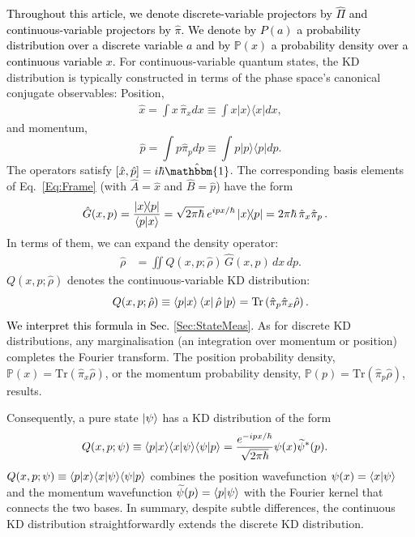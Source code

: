 \documentclass[%
 reprint,
superscriptaddress,
nofootinbib,
bibnotes,
 amsmath,amssymb,
 aps,
]{revtex4-1}
\theoremstyle{plain}
\newcommand*{\ketbra}[2]{\lvert #1 \rangle\!\langle #2 \rvert}
\newcommand{\Dave}[1]{\textcolor{black}{#1} }
\newcommand{\Stephan}[1]{\textcolor{black}{#1} }
\newcommand{\nicole}[1]{\textcolor{black}{#1} }
\begin{document}
\nicole{Throughout this article, we denote discrete-variable projectors by $\hat{\Pi}$ and continuous-variable projectors by $\hat{\pi}$.
We denote by $P(a)$ a probability distribution over a discrete variable $a$ and by $\mathbb{P}(x)$ a probability density over a continuous variable $x$.
}
For continuous-variable quantum states, the KD distribution is typically constructed in terms of the phase space's canonical conjugate observables: Position, 
\begin{eqnarray}
    \label{eq_position}
    \hat{x}=\int x \, \hat{\pi}_{x}dx 
    \equiv \int x \ketbra{x}{x}dx ,
\end{eqnarray}
and momentum,
\begin{equation}
    \label{eq_momentum}
    \hat{p}=\int p\hat{\pi}_{p}dp 
    \equiv \int p\ketbra{p}{p}dp  . 
\end{equation}
The operators satisfy $[\hat{x},\hat{p}]=i\hbar\hat{\mathbbm{1}}$. The corresponding 
\Dave{basis} elements of Eq.~\eqref{Eq:Frame} (with $\hat{A} = \hat{x}$ and $\hat{B} = \hat{p}$) have the form 
\begin{align}\label{eq:hatlambdaxp}
\hat{G}(x,p) & =\frac{\ketbra{x}{p}}{\braket{p|x}}
=\sqrt{2\pi\hbar} \: e^{ipx/\hbar} \, \ketbra{x}{p} 
=\Stephan{2\pi\hbar  \,  \hat\pi_x\hat \pi_p} \, .
\end{align}
In terms of them, we can expand the density operator:
\begin{align}
\hat{\rho} & =
\iint Q(x,p;\hat{\rho}) \, \hat{G}(x,p) \, dx \, dp.
\end{align}
$Q(x,p;\hat{\rho})$ denotes the continuous-variable KD distribution:
\begin{equation}
Q(x,p;\hat{\rho})
\equiv\braket{p|x}\bra{x}\hat{\rho}\ket{p}
=\mathrm{Tr}\left(  \hat{\pi}_{p}\hat{\pi}_{x}\hat{\rho}\right) .\label{eq:KD_continuous}
\end{equation}
\Dave{We interpret this formula in Sec. \ref{Sec:StateMeas}. } As 
for discrete KD distributions, any marginalisation (an integration over momentum or position) completes the Fourier transform. The position probability density, 
$\mathbb{P}(x)=\mathrm{Tr} \left( \hat{\pi}_{x}\hat{\rho} \right)$,
or the momentum probability density, 
$\mathbb{P}(p)  =  \mathrm{Tr}  \left(  \hat{\pi}_{p}\hat{\rho}  \right)$, results.

Consequently, a pure state $\ket{\psi}$ has a KD distribution
of the form
\begin{align}
Q(x,p;\psi) & \equiv\braket{p|x}\!\braket{x|\psi}\!\braket{\psi|p}
=\frac{e^{-ipx/\hbar}} {\sqrt{2\pi\hbar}} 
\psi(x)\widetilde{\psi}^{*}(p).
\end{align}
$Q(x,p;\psi) \equiv\braket{p|x}\!\braket{x|\psi}\!\braket{\psi|p}$ combines the position wavefunction $\psi(x)=\braket{x|\psi}$
and the momentum wavefunction $\widetilde{\psi}(p)=\braket{p|\psi}$
with the Fourier kernel that connects the two bases. 
In summary, despite 
subtle differences, the continuous KD distribution 
straightforwardly extends the discrete KD distribution. 
\end{document}
